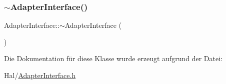 \hypertarget{class_adapter_interface_a1b1ab479bdaba7c80831d7bb950be7f5}{}\label{class_adapter_interface_a1b1ab479bdaba7c80831d7bb950be7f5} 
\subsubsection{\texorpdfstring{$\sim$\+Adapter\+Interface()}{~AdapterInterface()}}
{\footnotesize\ttfamily Adapter\+Interface\+::$\sim$\+Adapter\+Interface (\begin{DoxyParamCaption}{ }\end{DoxyParamCaption})}



Die Dokumentation für diese Klasse wurde erzeugt aufgrund der Datei\+:\begin{DoxyCompactItemize}
\item 
Hal/\hyperlink{_adapter_interface_8h}{Adapter\+Interface.\+h}\end{DoxyCompactItemize}
